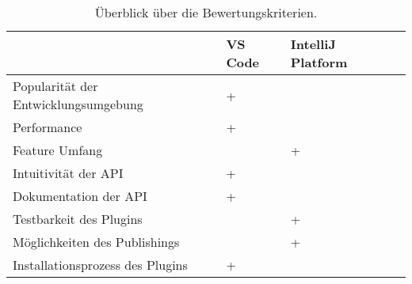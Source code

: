 \begin{table}[hb]
    \caption{Überblick über die Bewertungskriterien.}
    \label{tab:Ueberblick_Kriterien}
    \centering
    \setlength{\tabcolsep}{10pt} %
    \renewcommand{\arraystretch}{1.25} %

    \begin{tabular}{@{}llll@{}}
        \toprule
         & VS Code & IntelliJ Platform \\
        \midrule
        Popularität der Entwicklungsumgebung & + &  \\
        Performance & + &  \\
        Feature Umfang &  & + \\
        Intuitivität der API & + &  \\
        Dokumentation der API & + &  \\
        Testbarkeit des Plugins &  & + \\
        Möglichkeiten des Publishings &  & + \\
        Installationsprozess des Plugins & + &  \\
        \bottomrule
    \end{tabular}
    
\end{table}